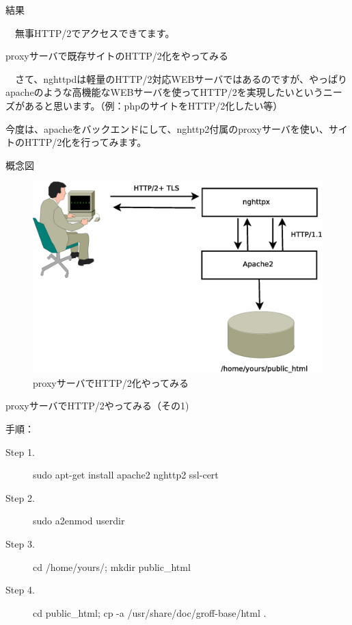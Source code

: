 \begin{frame}{結果}
\begin{center}  
{\LARGE　無事HTTP/2でアクセスできてます。}
\end{center}  
\end{frame}  

\begin{frame}{proxyサーバで既存サイトのHTTP/2化をやってみる}

　さて、nghttpdは軽量のHTTP/2対応WEBサーバではあるのですが、やっぱりapacheのような高機能なWEBサーバを使ってHTTP/2を実現したいというニーズがあると思います。（例：phpのサイトをHTTP/2化したい等）

 今度は、apacheをバックエンドにして、nghttp2付属のproxyサーバを使い、サイトのHTTP/2化を行ってみます。
  
\end{frame}  

\begin{frame}{概念図}

\begin{figure}[H]
\begin{center}
 \includegraphics[width=1.0\hsize]{image201507/nghttpx-apache-proxying.eps}
\end{center}
\caption{proxyサーバでHTTP/2化やってみる}
\end{figure}
  
\end{frame}    

\begin{frame}{proxyサーバでHTTP/2やってみる（その1)}

 手順：\\
\begin{description}
\item [Step 1.] sudo apt-get install apache2 nghttp2 ssl-cert
\item [Step 2.] sudo a2enmod userdir
\item [Step 3.] cd /home/yours/; mkdir public\_html
\item [Step 4.] cd public\_html; cp -a /usr/share/doc/groff-base/html .
\end{description}

\end{frame}


